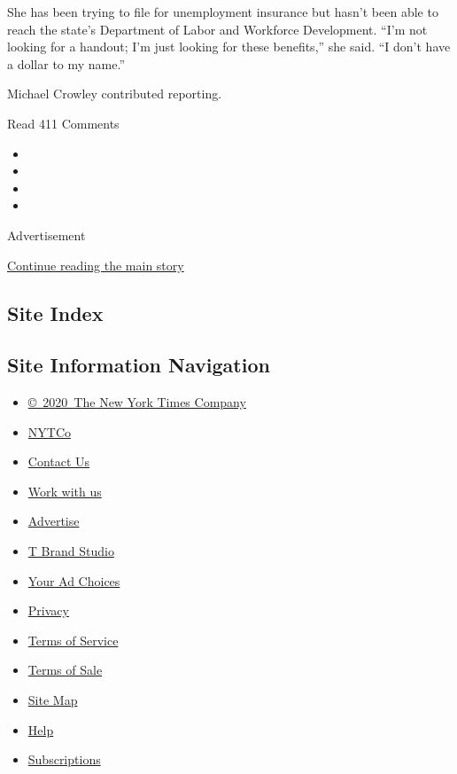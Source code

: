 She has been trying to file for unemployment insurance but hasn't been
able to reach the state's Department of Labor and Workforce Development.
``I'm not looking for a handout; I'm just looking for these benefits,''
she said. ``I don't have a dollar to my name.''

Michael Crowley contributed reporting.

Read 411 Comments

\begin{itemize}
\item
\item
\item
\item
\end{itemize}

Advertisement

\protect\hyperlink{after-bottom}{Continue reading the main story}

\hypertarget{site-index}{%
\subsection{Site Index}\label{site-index}}

\hypertarget{site-information-navigation}{%
\subsection{Site Information
Navigation}\label{site-information-navigation}}

\begin{itemize}
\tightlist
\item
  \href{https://help.nytimes.com/hc/en-us/articles/115014792127-Copyright-notice}{©~2020~The
  New York Times Company}
\end{itemize}

\begin{itemize}
\tightlist
\item
  \href{https://www.nytco.com/}{NYTCo}
\item
  \href{https://help.nytimes.com/hc/en-us/articles/115015385887-Contact-Us}{Contact
  Us}
\item
  \href{https://www.nytco.com/careers/}{Work with us}
\item
  \href{https://nytmediakit.com/}{Advertise}
\item
  \href{http://www.tbrandstudio.com/}{T Brand Studio}
\item
  \href{https://www.nytimes.com/privacy/cookie-policy\#how-do-i-manage-trackers}{Your
  Ad Choices}
\item
  \href{https://www.nytimes.com/privacy}{Privacy}
\item
  \href{https://help.nytimes.com/hc/en-us/articles/115014893428-Terms-of-service}{Terms
  of Service}
\item
  \href{https://help.nytimes.com/hc/en-us/articles/115014893968-Terms-of-sale}{Terms
  of Sale}
\item
  \href{https://spiderbites.nytimes.com}{Site Map}
\item
  \href{https://help.nytimes.com/hc/en-us}{Help}
\item
  \href{https://www.nytimes.com/subscription?campaignId=37WXW}{Subscriptions}
\end{itemize}
